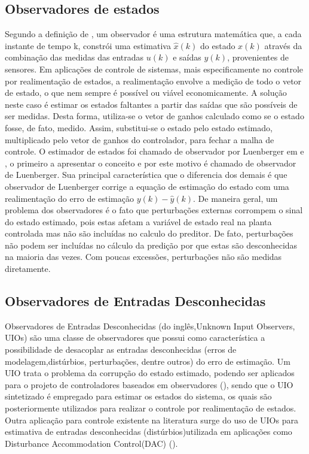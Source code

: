 \subsection{Observadores de estados}
Segundo a definição de \cite{EllisObserver}, um observador é uma estrutura matemática que, a cada instante de tempo k, constrói uma estimativa $\hat{x}(k)$ do estado $x(k)$ através da combinação das medidas das entradas $u(k)$ e saídas $y(k)$, provenientes de sensores. Em aplicações de controle de sistemas, mais especificamente no controle por realimentação de estados, a realimentação envolve a medição de todo o vetor de estado, o que nem sempre é possível ou viável economicamente. A solução neste caso é estimar os estados faltantes a partir das saídas que são possíveis de ser medidas. Desta forma, utiliza-se o vetor de ganhos calculado como se o estado fosse, de fato, medido. Assim, substitui-se o estado pelo estado estimado, multiplicado pelo vetor de ganhos do controlador, para fechar a malha de controle.
O estimador de estados foi chamado de observador por Luenberger em \cite{Luenberger1971AnObservers} e \cite{Luenberger}, o primeiro a apresentar o conceito e por este motivo é chamado de observador de Luenberger. Sua principal característica que o diferencia dos demais é que observador de Luenberger corrige a equação de estimação do estado com uma realimentação do erro de estimação $y(k)-\hat{y}(k)$.
De maneira geral, um problema dos observadores é o fato que perturbações externas corrompem o sinal do estado estimado, pois estas afetam a variável de estado real na planta controlada mas não são incluídas no calculo do preditor. De fato, perturbações não podem ser incluídas no cálculo da predição por que estas são desconhecidas na maioria das vezes. Com poucas excessões, perturbações não são medidas diretamente.  
\subsection{Observadores de Entradas Desconhecidas}
Observadores de Entradas Desconhecidas (do inglês,Unknown Input Observers, UIOs) são uma classe de observadores que possui como característica a possibilidade de desacoplar as entradas desconhecidas (erros de modelagem,distúrbios, perturbações, dentre outros) do erro de estimação. Um UIO trata o problema da corrupção do estado estimado, podendo ser aplicados para o projeto de controladores baseados em observadores (\cite{Zasadzinski1995LoopTR}), sendo que o UIO sintetizado é empregado para estimar os estados do sistema, os quais são posteriormente utilizados para realizar o controle por realimentação de estados. Outra aplicação para controle existente na literatura surge do uso de UIOs para estimativa de entradas desconhecidas (distúrbios)utilizada em aplicações como Disturbance Accommodation Control(DAC) (\cite{Chen2016Disturbance-Observer-BasedOverview}).